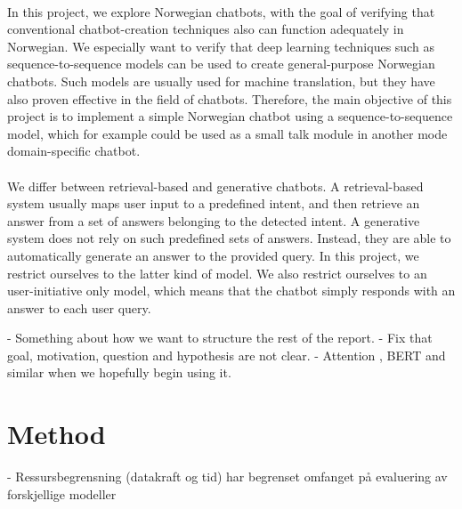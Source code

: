 \documentclass{article}
\begin{document}
\paragraph{}
In this project, we explore Norwegian chatbots, with the goal of verifying that
conventional chatbot-creation techniques also can function adequately in
Norwegian. We especially want to verify that deep learning techniques such as
sequence-to-sequence models \cite{Cho2014} can be used to create
general-purpose Norwegian chatbots. Such models are usually used for machine
translation, but they have also proven effective in the field of chatbots.
Therefore, the main objective of this project is to implement a simple Norwegian
chatbot using a sequence-to-sequence model, which for example could be used as
a small talk module in another mode domain-specific chatbot.

\paragraph{}
We differ between retrieval-based and generative chatbots. A retrieval-based
system usually maps user input to a predefined intent, and then retrieve an
answer from a set of answers belonging to the detected intent. A generative
system does not rely on such predefined sets of answers.  Instead, they are
able to automatically generate an answer to the provided query. In this
project, we restrict ourselves to the latter kind of model. We also restrict
ourselves to an user-initiative only model, which means that the chatbot simply
responds with an answer to each user query.

\if
- Something about how we want to structure the rest of the report.  
- Fix that goal, motivation, question and hypothesis are not clear.  
- Attention \cite{Bahdanau2015}, BERT and similar when we hopefully begin using it.
\fi

\section*{Method}
\if
 - Ressursbegrensning (datakraft og tid) har begrenset omfanget på evaluering
 av forskjellige modeller
\fi
\end{document}
